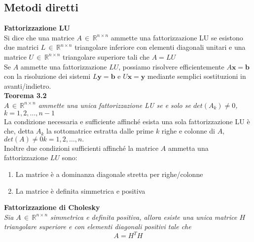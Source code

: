 \documentclass[a4paper,12pt]{article}
\begin{document}
\subsection{Metodi diretti} 
\textbf{Fattorizzazione LU} \\
Si dice che una matrice $A \, \in \, \mathbb{R}^{n \times n}$ ammette una fattorizzazione LU se esistono due matrici $L \, \in \, \mathbb{R}^{n \times n}$ triangolare inferiore con elementi diagonali unitari e una matrice $U \, \in \, \mathbb{R}^{n \times n}$ triangolare superiore tali che $A = LU$ \\
Se $A$ ammette una fattorizzazione $LU$, possiamo risolvere efficientemente $A\textbf{x}= \textbf{b}$ con la risoluzione dei sistemi $L\textbf{y}=\textbf{b}$ e $U\textbf{x} = \textbf{y}$ mediante semplici sostituzioni in avanti/indietro. \\
\textbf{Teorema 3.2} \\
\textit{$A \, \in \, \mathbb{R}^{n \times n}$ ammette una unica fattorizzazione LU se e solo se $det(A_{k}) \neq 0$, $k = 1, 2, \ldots, n-1$ } \\
La condizione necessaria e sufficiente affinché esista una sola fattorizzazione LU è che, detta $A_k$ la sottomatrice estratta dalle prime $k$ righe e colonne di $A$, $det(A) \neq 0 k = 1, 2, \ldots, n.$ \\
Inoltre due condizioni sufficienti affinché la matrice $A$ ammetta una fattorizzazione $LU$ sono:
\begin{enumerate}
\item La matrice è a dominanza diagonale stretta per righe/colonne
\item La matrice è definita simmetrica e positiva
\end{enumerate}

\textbf{Fattorizzazione di Cholesky} \\
\textit{Sia $A \, \in \, \mathbb{R}^{n \times n}$ simmetrica e definita positiva, allora esiste una unica matrice $H$ triangolare superiore e con elementi diagonali positivi tale che 
$$ A = H^{T}H $$
}
\end{document}
